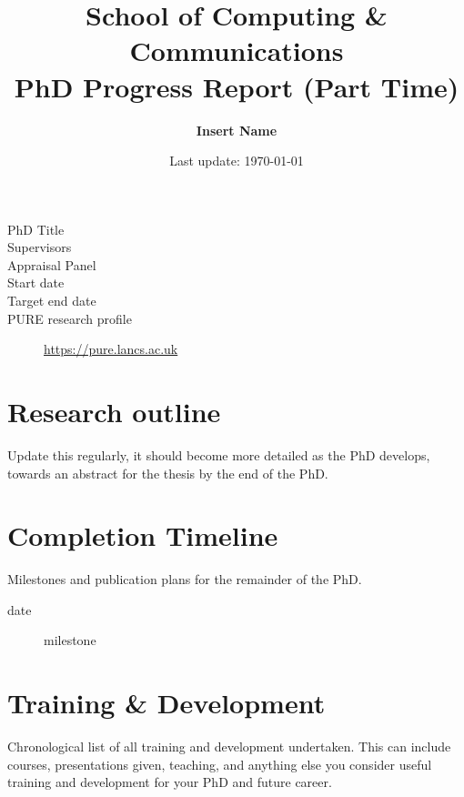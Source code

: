 \documentclass[12pt,a4paper]{article}
\author{\LARGE \textbf{Insert Name}} %
\title{School of Computing \& Communications\\PhD Progress Report (Part Time)}
\date{Last update: \today}
\begin{document}
\maketitle

\begin{description}
	\item[PhD Title] %
	\item[Supervisors] %
	\item[Appraisal Panel] %
	\item[Start date] %
	\item[Target end date] %
	\item[PURE research profile] \url{https://pure.lancs.ac.uk} %
\end{description}

\section{Research outline}
Update this regularly, it should become more detailed as the PhD develops, towards an abstract for the thesis by the end of the PhD.


\section{Completion Timeline}
Milestones and publication plans for the remainder of the PhD.


\begin{description}
	\item[date] milestone
\end{description}

\section{Training \& Development}
Chronological list of all training and development undertaken. This can include courses, presentations given, teaching, and anything else you consider useful training and development for your PhD and future career.
\end{document}
